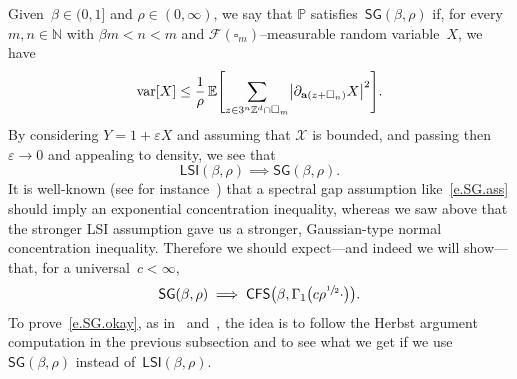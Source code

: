 \documentclass[11pt]{article} %
\let\oldsquare\square %
\renewcommand{\square}{\oldsquare}
\numberwithin{equation}{section}
\theoremstyle{definition}
\let\originalleft\left
\let\originalright\right
\renewcommand{\left}{\mathopen{}\mathclose\bgroup\originalleft}
\renewcommand{\right}{\aftergroup\egroup\originalright}
\newcommand*{\N}{\ensuremath{\mathbb{N}}}
\newcommand*{\Zd}{\ensuremath{\mathbb{Z}^d}}
\newcommand{\eps}{\varepsilon}
\newcommand{\ep}{\eps}
\renewcommand{\a}{\mathbf{a}}
\newcommand{\cu}{\square}
\newcommand{\F}{\mathcal{F}}
\renewcommand{\P}{\mathbb{P}}
\newcommand{\E}{\mathbb{E}}
\newcommand{\X}{\mathcal{X}}
\DeclareMathOperator{\var}{var}
\newcommand{\CFS}{\mathsf{CFS}}
\newcommand{\LSI}{\mathsf{LSI}}
\newcommand{\SG}{\mathsf{SG}}
\begin{document}
Given~$\beta\in (0,1]$ and $\rho\in (0,\infty)$, we say that $\P$ satisfies~$\SG(\beta,\rho)$ if, for every $m,n\in\N$ with $\beta m  < n < m$ and $\F(\cu_m)$--measurable random variable~$X$, we have 
\begin{equation} 
\label{e.SG.ass}
\var\left[  X \right]
\leq 
\frac1\rho\,
\E \Biggl[
\sum_{z\in 3^n\Zd \cap \cu_m}
\left| \partial_{\a(z+\cu_n)} X
\right|^2
\Biggr]. 
\end{equation}
By considering $Y = 1 + \ep X$ and assuming that $\X$ is bounded, and passing then~$\ep \to 0$ and appealing to density, we see that
\begin{equation*} \label{}
\LSI(\beta,\rho) \implies \SG(\beta,\rho).
\end{equation*}
It is well-known (see for instance~\cite{L}) that a spectral gap assumption like~\eqref{e.SG.ass} should imply an exponential concentration inequality, whereas we saw above that the stronger LSI assumption gave us a stronger, Gaussian-type normal concentration inequality. Therefore we should expect---and indeed we will show---that, for a universal~$c<\infty$, 
\begin{equation} 
\label{e.SG.okay}
\SG(\beta,\rho) \implies \CFS\bigl(\beta,\Gamma_1\bigl(c\rho^{\sfrac12} \cdot \bigr)  \bigr).
\end{equation}
To prove~\eqref{e.SG.okay}, as in~\cite{AiS} and~\cite[Section 2]{L}, the idea is to follow the Herbst argument computation in the previous subsection and to see what we get if we use~$\SG(\beta,\rho)$ instead of~$\LSI(\beta,\rho)$. 

\smallskip
\end{document}
